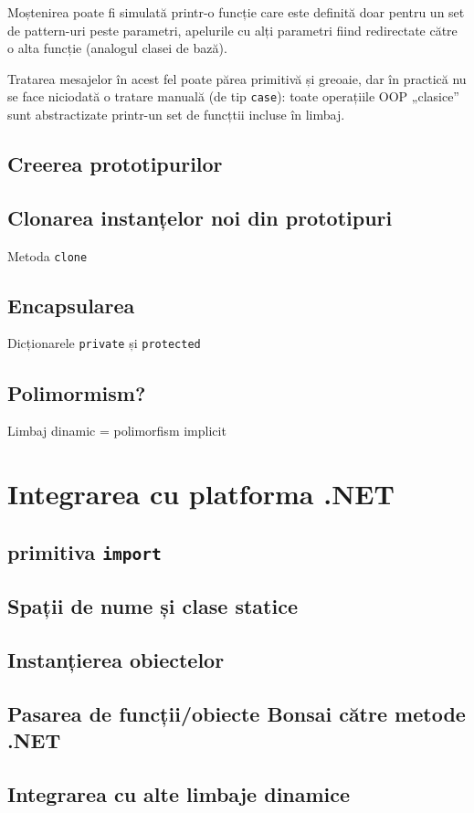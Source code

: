 \documentclass[12pt,a4paper]{memoir}
\begin{document}
Moștenirea poate fi simulată printr-o funcție care este definită doar pentru un set de pattern-uri peste parametri, apelurile cu alți parametri fiind redirectate către o alta funcție (analogul clasei de bază).

Tratarea mesajelor în acest fel poate părea primitivă și greoaie, dar în practică nu se face niciodată o tratare manuală (de tip \texttt{case}): toate operațiile OOP „clasice” sunt abstractizate printr-un set de funcțtii incluse în limbaj.

\section{Creerea prototipurilor}

\section{Clonarea instanțelor noi din prototipuri}

Metoda \texttt{clone}

\section{Encapsularea}

Dicționarele \texttt{private} și \texttt{protected}

\section{Polimormism?}

Limbaj dinamic = polimorfism implicit

\chapter{Integrarea cu platforma .NET}

\section{primitiva \texttt{import}}

\section{Spații de nume și clase statice}

\section{Instanțierea obiectelor}

\section{Pasarea de funcții/obiecte Bonsai către metode .NET}

\section{Integrarea cu alte limbaje dinamice}

{}

\end{document}
